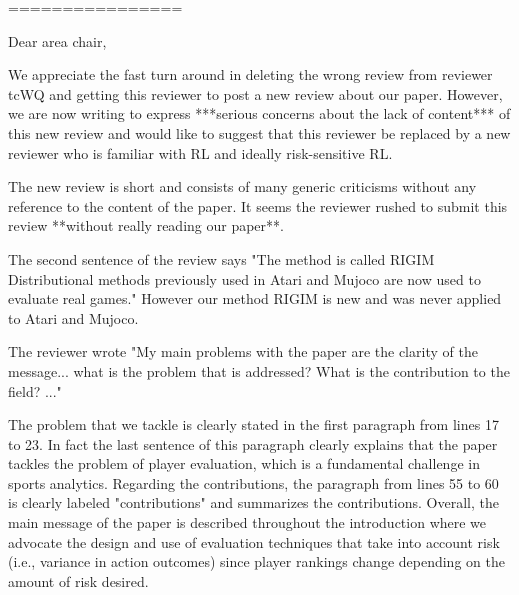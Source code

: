 \documentclass{article}
\begin{document}


================

Dear area chair,

We appreciate the fast turn around in deleting the wrong review from reviewer tcWQ and getting this reviewer to post a new review about our paper.  However, we are now writing to express ***serious concerns about the lack of content*** of this new review and would like to suggest that this reviewer be replaced by a new reviewer who is familiar with RL and ideally risk-sensitive RL.  

The new review is short and consists of many generic criticisms without any reference to the content of the paper.  It seems the reviewer rushed to submit this review **without really reading our paper**.  

The second sentence of the review says "The method is called RIGIM Distributional methods previously used in Atari and Mujoco are now used to evaluate real games."  However our method RIGIM is new and was never applied to Atari and Mujoco.  

The reviewer wrote "My main problems with the paper are the clarity of the message... what is the problem that is addressed? What is the contribution to the field? ..."

The problem that we tackle is clearly stated in the first paragraph from lines 17 to 23.  In fact the last sentence of this paragraph clearly explains that the paper tackles the problem of player evaluation, which is a fundamental challenge in sports analytics.  Regarding the contributions, the paragraph from lines 55 to 60 is clearly labeled "contributions" and summarizes the contributions.  Overall, the main message of the paper is described throughout the introduction where we advocate the design and use of evaluation techniques that take into account risk (i.e., variance in action outcomes) since player rankings change depending on the amount of risk desired. 
\end{document}

